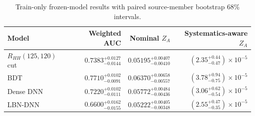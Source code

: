 \begin{table}[tb]
  \centering
  \footnotesize
  \caption{Train-only frozen-model results with paired source-member bootstrap 68\% intervals.}
  \label{tab:baseline-uncertainty-summary}
  \begin{tabular}{lrrr}
    \toprule
    Model & Weighted AUC & Nominal $Z_A$ & Systematics-aware $Z_A$ \\
    \midrule
    $R_{HH}(125,120)$ cut & $0.7383^{+0.0127}_{-0.0144}$ & $0.05195^{+0.00407}_{-0.00410}$ & $(2.35^{+0.44}_{-0.47})\times10^{-5}$ \\
    BDT & $0.7710^{+0.0102}_{-0.0091}$ & $0.06370^{+0.00658}_{-0.00557}$ & $(3.78^{+0.94}_{-0.75})\times10^{-5}$ \\
    Dense DNN & $0.7220^{+0.0102}_{-0.0111}$ & $0.05772^{+0.00484}_{-0.00436}$ & $(3.06^{+0.62}_{-0.54})\times10^{-5}$ \\
    LBN-DNN & $0.6600^{+0.0162}_{-0.0155}$ & $0.05222^{+0.00405}_{-0.00348}$ & $(2.55^{+0.47}_{-0.35})\times10^{-5}$ \\
    \bottomrule
  \end{tabular}
\end{table}
